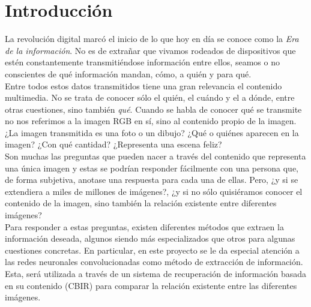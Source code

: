 %


\chapter{Introducción}
La revolución digital marcó el inicio de lo que hoy en día se conoce como la \emph{Era de la información}. No es de extrañar que vivamos rodeados de dispositivos que estén constantemente transmitiéndose información entre ellos, seamos o no conscientes de qué información mandan, cómo, a quién y para qué. \\


Entre todos estos datos transmitidos tiene una gran relevancia el contenido multimedia. No se trata de conocer sólo el quién, el cuándo y el a dónde, entre otras cuestiones, sino también \emph{qué}. Cuando se habla de conocer qué se transmite no nos referimos a la imagen RGB en sí, sino al contenido propio de la imagen. ¿La imagen transmitida es una foto o un dibujo? ¿Qué o quiénes aparecen en la imagen? ¿Con qué cantidad? ¿Representa una escena feliz?\\

Son muchas las preguntas que pueden nacer a través del contenido que representa una única imagen y estas se podrían responder fácilmente con una persona que, de forma subjetiva, anotase una respuesta para cada una de ellas. Pero, ¿y si se extendiera a miles de millones de imágenes?, ¿y si no sólo quisiéramos conocer el contenido de la imagen, sino también la relación existente entre diferentes imágenes?\\

Para responder a estas preguntas, existen diferentes métodos que extraen la información deseada, algunos siendo más especializados que otros para algunas cuestiones concretas. En particular, en este proyecto se le da especial atención a las redes neuronales convolucionadas como método de extracción de información. Esta, será utilizada a través de un sistema de recuperación de información basada en su contenido (CBIR) para comparar la relación existente entre las diferentes imágenes.\\

